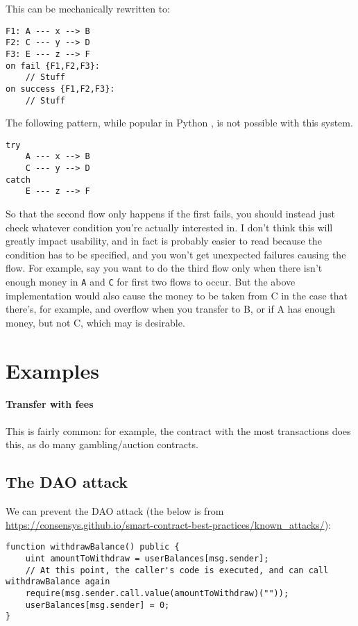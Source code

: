 \documentclass[10pt]{article}
\begin{document}
This can be mechanically rewritten to:
\begin{lstlisting}
F1: A --- x --> B
F2: C --- y --> D
F3: E --- z --> F
on fail {F1,F2,F3}:
    // Stuff
on success {F1,F2,F3}:
    // Stuff
\end{lstlisting}

The following pattern, while popular in Python , is not possible with this system.
\begin{lstlisting}
try
    A --- x --> B
    C --- y --> D
catch
    E --- z --> F
\end{lstlisting}

So that the second flow only happens if the first fails, you should instead just check whatever condition you're actually interested in.
I don't think this will greatly impact usability, and in fact is probably easier to read because the condition has to be specified, and you won't get unexpected failures causing the flow.
For example, say you want to do the third flow only when there isn't enough money in \lstinline{A} and \lstinline{C} for first two flows to occur.
But the above implementation would also cause the money to be taken from C in the case that there's, for example, and overflow when you transfer to B, or if A has enough money, but not C, which may is desirable.

\section{Examples}
\paragraph{Transfer with fees}
This is fairly common: for example, the contract with the most transactions does this, as do many gambling/auction contracts.

\subsection{The DAO attack}
We can prevent the DAO attack (the below is from \url{https://consensys.github.io/smart-contract-best-practices/known_attacks/}):
\begin{lstlisting}
function withdrawBalance() public {
    uint amountToWithdraw = userBalances[msg.sender];
    // At this point, the caller's code is executed, and can call withdrawBalance again
    require(msg.sender.call.value(amountToWithdraw)(""));
    userBalances[msg.sender] = 0;
}
\end{lstlisting}
\end{document}
